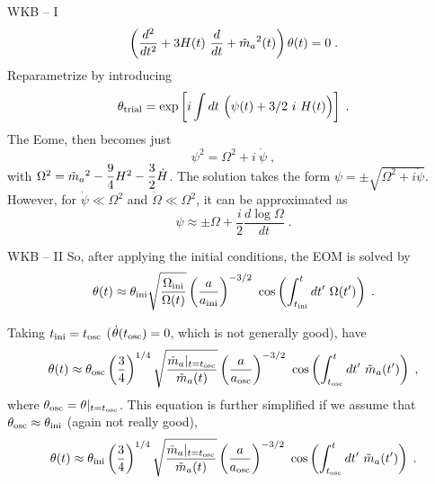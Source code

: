 \documentclass[10pt,utf8,compress,xcolor=dvipsnames]{beamer}
\begin{document}
\begin{frame}{WKB -- I}
	\begin{equation*}
		\left( \dfrac{d^2}{d t^2} + 3 H(t) \ \dfrac{d}{d t} + \tilde m_{a}{}^2(t)  \right) \theta(t) = 0 \; .
	\end{equation*}
	Reparametrize by introducing
	\begin{equation*}
		\theta_{\rm trial} = \exp\left[  i \displaystyle \int d t \ \Big( \psi(t) +3/2 \ i \ H(t) \Big)  \right] \;.
	\end{equation*}
	The Eome, then becomes just
	\begin{equation*}
		\psi^2 = \Omega^2 + i \ \dot \psi \; ,
	\end{equation*}
	with $\Omega^2 = \tilde m_{a}{}^2 - \dfrac{9}{4} H^2 -  \dfrac{3}{2} \dot H $.
	The solution takes the form $\psi = \pm \sqrt{\Omega^2 + i \dot \psi}$. However, for $\dot \psi \ll \Omega^2$ and $\dot \Omega \ll \Omega^2$, it can be approximated as
	\begin{equation*}
		\psi \approx \pm \Omega + \dfrac{i}{2} \dfrac{d \log \Omega}{d t} \;.
	\end{equation*}
\end{frame}

\begin{frame}{WKB -- II}
	So, after applying the initial conditions, the EOM is solved by
	\begin{equation*}
		\theta(t) \approx \thetai \sqrt{ \dfrac{ \Omegai }{\Omega (t)} } \lrb{\dfrac{a}{\ai}}^{-3/2} \  \cos\lrb{ \int_{\ti}^t d t^\prime  \ \Omega(t^\prime)}   \;.
	\end{equation*}

	Taking  $t_{\rm ini}{} = t_{\rm osc}{}$ (\ie $\dot \theta(t_{\rm osc}{}) = 0$, which is not generally good), have
	\begin{equation*}
		\theta(t) \approx \theta_{\rm osc}{} \left( \dfrac{3}{4} \right)^{1/4} \sqrt{ \dfrac{ \tilde m_{a}{}|_{t=t_{\rm osc}{}} }{\tilde m_{a}{}  (t)} } \left( \dfrac{a}{a_{\rm osc}{}} \right)^{-3/2} \  \cos\left(  \int_{t_{\rm osc}{}}^t d t^\prime  \ \tilde m_{a}{}(t^\prime) \right)   \;,
	\end{equation*}
	where $\theta_{\rm osc}{} = \theta|_{t=t_{\rm osc}{}}$. This equation is further simplified if we assume that $\theta_{\rm osc}{} \approx \theta_{\rm ini}{}$ (again not really good), \ie
	\begin{equation*}
		\theta(t) \approx \thetai \lrb{\dfrac{3}{4}}^{1/4} \sqrt{ \dfrac{ \maT|_{t=\tosc} }{\maT  (t)} } \lrb{\dfrac{a}{\aosc}}^{-3/2} \  \cos\lrb{ \int_{\tosc}^t d t^\prime  \ \maT(t^\prime)}   \;.
	\end{equation*}

	
\end{frame}
\end{document}
